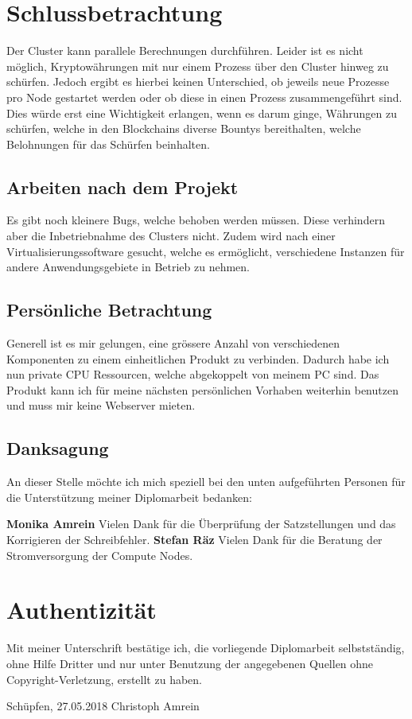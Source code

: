 \section{Schlussbetrachtung} 
\label{sec:Schlussbetrachtung}
Der Cluster kann parallele Berechnungen durchführen. Leider ist es nicht möglich, Kryptowährungen mit nur einem Prozess über den Cluster hinweg zu schürfen. Jedoch ergibt es hierbei keinen Unterschied, ob jeweils neue Prozesse pro Node gestartet werden oder ob diese in einen Prozess zusammengeführt sind. Dies würde erst eine Wichtigkeit erlangen, wenn es darum ginge, Währungen zu schürfen, welche in den Blockchains diverse Bountys bereithalten, welche Belohnungen für das Schürfen beinhalten.

\subsection{Arbeiten nach dem Projekt}
Es gibt noch kleinere Bugs, welche behoben werden müssen. Diese verhindern aber die Inbetriebnahme des Clusters nicht. Zudem wird nach einer Virtualisierungssoftware gesucht, welche es ermöglicht, verschiedene Instanzen für andere Anwendungsgebiete in Betrieb zu nehmen.

\subsection{Persönliche Betrachtung}
Generell ist es mir gelungen, eine grössere Anzahl von verschiedenen Komponenten zu einem einheitlichen Produkt zu verbinden. Dadurch habe ich nun private CPU Ressourcen, welche abgekoppelt von meinem PC sind. Das Produkt kann ich für meine nächsten persönlichen Vorhaben weiterhin benutzen und muss mir keine Webserver mieten.
 
\subsection{Danksagung}
An dieser Stelle möchte ich mich speziell bei den unten aufgeführten Personen für die Unterstützung meiner Diplomarbeit bedanken:

\textbf{Monika Amrein}\newline
Vielen Dank für die Überprüfung der Satzstellungen und das Korrigieren der Schreibfehler.\newline
\textbf{Stefan Räz}\newline
Vielen Dank für die Beratung der Stromversorgung der Compute Nodes.

\newpage
\section{Authentizität}
Mit meiner Unterschrift bestätige ich, die vorliegende Diplomarbeit selbstständig, ohne Hilfe Dritter und nur unter Benutzung der angegebenen Quellen ohne Copyright-Verletzung, erstellt zu haben.

Schüpfen, 27.05.2018\newline
\newline
\newline
Christoph Amrein

